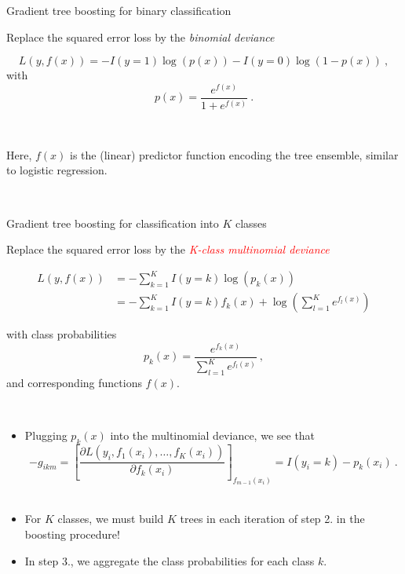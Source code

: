 \documentclass[
  10pt,
  ignorenonframetext,
]{beamer}
\providecommand{\tightlist}{%
  \setlength{\itemsep}{0pt}\setlength{\parskip}{0pt}}
\begin{document}
\begin{frame}
\begin{block}{Gradient tree boosting for binary classification}
\protect\hypertarget{gradient-tree-boosting-for-binary-classification}{}
\(~\)

Replace the squared error loss by the \emph{binomial deviance}

\[L(y,f(x)) = -I(y=1) \log(p(x)) - I(y=0) \log(1-p(x)) \ , \] with
\[p(x) = \frac{e^{f(x)}}{1+e^{f(x)}} \ .\]

\(~\)

Here, \(f(x)\) is the (linear) predictor function encoding the tree
ensemble, similar to logistic regression.

\(~\)
\end{block}
\end{frame}

\begin{frame}
\begin{block}{Gradient tree boosting for classification into \(K\)
classes}
\protect\hypertarget{gradient-tree-boosting-for-classification-into-k-classes}{}
\(~\)

Replace the squared error loss by the
\emph{\textcolor{red}{K-class multinomial deviance}}

\begin{align}
L(y,f(x)) &= -\sum_{k=1}^K I(y = k) \log (p_k(x)) \\ 
 & = -\sum_{k=1}^K I(y = k) f_k(x) + \log(\sum_{l=1}^K e^{f_l(x)})
 \end{align}

with class probabilities
\[p_k(x) = \frac{e^{f_k(x)}}{\sum_{l=1}^K e^{f_l(x)}} \ , \] and
corresponding functions \(f(x)\).
\end{block}
\end{frame}

\begin{frame}
\(~\)

\begin{itemize}
\item
  Plugging \(p_k(x)\) into the multinomial deviance, we see that\\
  \[-g_{ikm} = \left[ \frac{\partial L(y_i, f_1(x_i),\ldots, f_K(x_i))}{\partial f_k(x_i)} \right]_{f_{m-1}(x_i)} = I(y_i =k) - p_k(x_i) \ .\]
  \(~\)
\item
  For \(K\) classes, we must build \(K\) trees in each iteration of step
  2. in the boosting procedure!
\end{itemize}

\vspace{2mm}

\begin{itemize}
\tightlist
\item
  In step 3., we aggregate the class probabilities for each class \(k\).
\end{itemize}
\end{frame}
\end{document}
